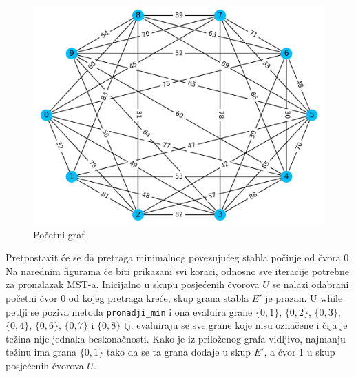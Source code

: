 \documentclass[conference]{IEEEtran}
\begin{document}
\begin{figure}[H]
\centering
\includegraphics[width=1\linewidth]{slike/300dpi/0d.jpg}
\caption{Početni graf}
\end{figure}

Pretpostavit će se da pretraga minimalnog povezujućeg stabla počinje od čvora 0. Na narednim figurama će biti prikazani svi koraci, odnosno sve iteracije potrebne za pronalazak MST-a.
Inicijalno u skupu posjećenih čvorova $U$ se nalazi odabrani početni čvor 0 od kojeg pretraga kreće, skup grana stabla $E'$ je prazan. U while petlji se poziva metoda \texttt{pronadji\_min} i ona evaluira grane $\{0,1\}$, $\{0,2\}$, $\{0,3\}$, $\{0,4\}$, $\{0,6\}$, $\{0,7\}$ i $\{0,8\}$ tj. evaluiraju se sve grane koje nisu označene i čija je težina nije jednaka beskonačnosti. Kako je iz priloženog grafa vidljivo, najmanju težinu ima grana $\{0,1\}$ tako da se ta grana dodaje u skup $E'$, a čvor 1 u skup posjećenih čvorova $U$.
\end{document}
